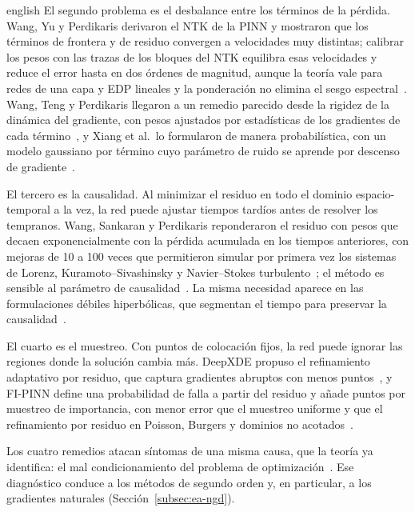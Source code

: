 \documentclass[../0000.tex]{subfiles}
\begin{document}
\begin{hyphenrules}{english}
El segundo problema es el desbalance entre los términos de la pérdida. Wang, Yu y Perdikaris derivaron el NTK de la PINN y mostraron que los términos de frontera y de residuo convergen a velocidades muy distintas; calibrar los pesos con las trazas de los bloques del NTK equilibra esas velocidades y reduce el error hasta en dos órdenes de magnitud, aunque la teoría vale para redes de una capa y EDP lineales y la ponderación no elimina el sesgo espectral~\cite{wang2022and}. Wang, Teng y Perdikaris llegaron a un remedio parecido desde la rigidez de la dinámica del gradiente, con pesos ajustados por estadísticas de los gradientes de cada término~\cite{wang2021understanding}, y Xiang et al.\ lo formularon de manera probabilística, con un modelo gaussiano por término cuyo parámetro de ruido se aprende por descenso de gradiente~\cite{xiang2022self}.

El tercero es la causalidad. Al minimizar el residuo en todo el dominio espacio-temporal a la vez, la red puede ajustar tiempos tardíos antes de resolver los tempranos. Wang, Sankaran y Perdikaris reponderaron el residuo con pesos que decaen exponencialmente con la pérdida acumulada en los tiempos anteriores, con mejoras de 10 a 100 veces que permitieron simular por primera vez los sistemas de Lorenz, Kuramoto--Sivashinsky y Navier--Stokes turbulento~\cite{wang2022respecting}; el método es sensible al parámetro de causalidad~\cite{wang2023expert}. La misma necesidad aparece en las formulaciones débiles hiperbólicas, que segmentan el tiempo para preservar la causalidad~\cite{chaumet2024improving}.

El cuarto es el muestreo. Con puntos de colocación fijos, la red puede ignorar las regiones donde la solución cambia más. DeepXDE propuso el refinamiento adaptativo por residuo, que captura gradientes abruptos con menos puntos~\cite{lu2021deepxde}, y FI-PINN define una probabilidad de falla a partir del residuo y añade puntos por muestreo de importancia, con menor error que el muestreo uniforme y que el refinamiento por residuo en Poisson, Burgers y dominios no acotados~\cite{gao2023failure}.

Los cuatro remedios atacan síntomas de una misma causa, que la teoría ya identifica: el mal condicionamiento del problema de optimización~\cite{de2024numerical,zhang2026physics}. Ese diagnóstico conduce a los métodos de segundo orden y, en particular, a los gradientes naturales (Sección~\ref{subsec:ea-ngd}).


\end{hyphenrules}
\end{document}

